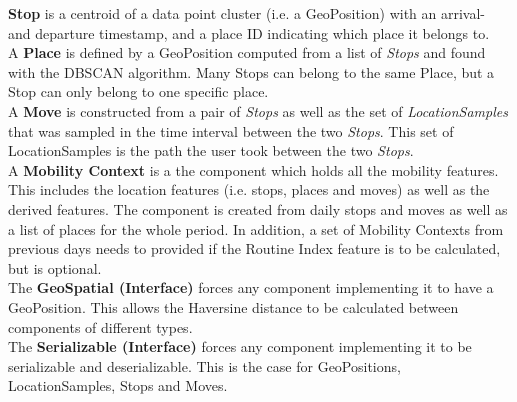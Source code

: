 \textbf{Stop} is a centroid of a data point cluster (i.e. a GeoPosition) with an arrival- and departure timestamp, and a place ID indicating which place it belongs to.\\

A \textbf{Place} is defined by a GeoPosition computed from a list of \textit{Stops} and found with the DBSCAN algorithm. Many Stops can belong to the same Place, but a Stop can only belong to one specific place.\\

A \textbf{Move} is constructed from a pair of \textit{Stops} as well as the set of \textit{LocationSamples} that was sampled in the time interval between the two \textit{Stops}. This set of LocationSamples is the path the user took between the two \textit{Stops}.\\

A \textbf{Mobility Context} is a the component which holds all the mobility features. This includes the location features (i.e. stops, places and moves) as well as the derived features. The component is created from daily stops and moves as well as a list of places for the whole period. In addition, a set of Mobility Contexts from previous days needs to provided if the Routine Index feature is to be calculated, but is optional. \\

The \textbf{GeoSpatial (Interface)} forces any component implementing it to have a GeoPosition. This allows the Haversine distance to be calculated between components of different types.\\

The \textbf{Serializable (Interface)} forces any component implementing it to be serializable and deserializable. This is the case for GeoPositions, LocationSamples, Stops and Moves.

